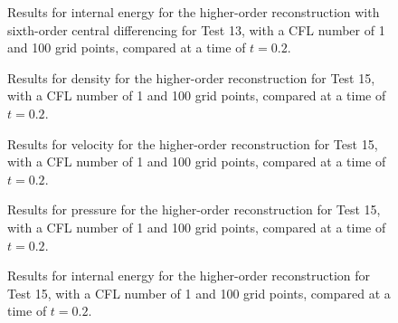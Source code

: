 \begin{figure}
	\caption[Results for internal energy for the higher-order reconstruction with sixth-order central differencing for Test 13, with a CFL number of 1 and 100 grid points, compared at a time of $t=0.2$.]{Results for internal energy for the higher-order reconstruction with sixth-order central differencing for Test 13, with a CFL number of 1 and 100 grid points, compared at a time of $t=0.2$.}
	\label{fig:Test13HORCD6energy}
\end{figure}

\begin{figure}
	\caption[Results for density for the higher-order reconstruction for Test 15, with a CFL number of 1 and 100 grid points, compared at a time of $t=0.2$.]{Results for density for the higher-order reconstruction for Test 15, with a CFL number of 1 and 100 grid points, compared at a time of $t=0.2$.}
	\label{fig:Test15HORdensity}
\end{figure}

\begin{figure}
	\caption[Results for velocity for the higher-order reconstruction for Test 15, with a CFL number of 1 and 100 grid points, compared at a time of $t=0.2$.]{Results for velocity for the higher-order reconstruction for Test 15, with a CFL number of 1 and 100 grid points, compared at a time of $t=0.2$.}
	\label{fig:Test15HORvelocity}
\end{figure}

\begin{figure}
	\caption[Results for pressure for the higher-order reconstruction for Test 15, with a CFL number of 1 and 100 grid points, compared at a time of $t=0.2$.]{Results for pressure for the higher-order reconstruction for Test 15, with a CFL number of 1 and 100 grid points, compared at a time of $t=0.2$.}
	\label{fig:Test15HORpressure}
\end{figure}

\begin{figure}
	\caption[Results for internal energy for the higher-order reconstruction for Test 15, with a CFL number of 1 and 100 grid points, compared at a time of $t=0.2$.]{Results for internal energy for the higher-order reconstruction for Test 15, with a CFL number of 1 and 100 grid points, compared at a time of $t=0.2$.}
	\label{fig:Test15HORenergy}
\end{figure}

